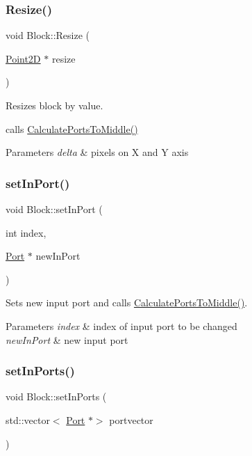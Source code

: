 \subsubsection{\texorpdfstring{Resize()}{Resize()}}
{\footnotesize\ttfamily void Block\+::\+Resize (\begin{DoxyParamCaption}\item[{\hyperlink{classPoint2D}{Point2D} $\ast$}]{resize }\end{DoxyParamCaption})}

Resizes block by value.

calls \hyperlink{}{Calculate\+Ports\+To\+Middle()} 
\begin{DoxyParams}{Parameters}
{\em delta} & pixels on X and Y axis \\
\hline
\end{DoxyParams}
\mbox{\label{classBlock_aa24819f99f922d0b2cba3d12775974e0}} 
\subsubsection{\texorpdfstring{set\+In\+Port()}{setInPort()}}
{\footnotesize\ttfamily void Block\+::set\+In\+Port (\begin{DoxyParamCaption}\item[{int}]{index,  }\item[{\hyperlink{classPort}{Port} $\ast$}]{new\+In\+Port }\end{DoxyParamCaption})}

Sets new input port and calls \hyperlink{}{Calculate\+Ports\+To\+Middle()}.


\begin{DoxyParams}{Parameters}
{\em index} & index of input port to be changed \\
\hline
{\em new\+In\+Port} & new input port \\
\hline
\end{DoxyParams}
\mbox{\label{classBlock_aa67c1224df9015c055fa5523dfa67f52}} 
\subsubsection{\texorpdfstring{set\+In\+Ports()}{setInPorts()}}
{\footnotesize\ttfamily void Block\+::set\+In\+Ports (\begin{DoxyParamCaption}\item[{std\+::vector$<$ \hyperlink{classPort}{Port} $\ast$$>$}]{portvector }\end{DoxyParamCaption})}

